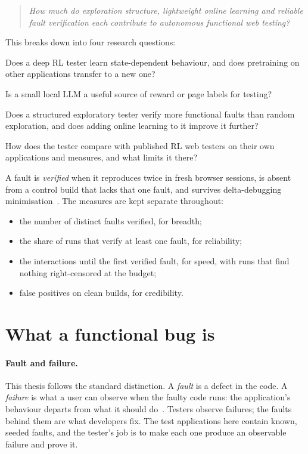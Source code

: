 \begin{quote}
\emph{How much do exploration structure, lightweight online learning and reliable fault
verification each contribute to autonomous functional web testing?}
\end{quote}

This breaks down into four research questions:
\begin{description}[noitemsep]
  \item[RQ1] Does a deep RL tester learn state-dependent behaviour, and does pretraining on
        other applications transfer to a new one?
  \item[RQ2] Is a small local LLM a useful source of reward or page labels for testing?
  \item[RQ3] Does a structured exploratory tester verify more functional faults than random
        exploration, and does adding online learning to it improve it further?
  \item[RQ4] How does the tester compare with published RL web testers on their own
        applications and measures, and what limits it there?
\end{description}

A fault is \emph{verified} when it reproduces twice in fresh browser sessions, is absent
from a control build that lacks that one fault, and survives delta-debugging
minimisation~\cite{zeller2002simplifying}. The measures are kept separate throughout:
\begin{itemize}[noitemsep]
  \item the number of distinct faults verified, for breadth;
  \item the share of runs that verify at least one fault, for reliability;
  \item the interactions until the first verified fault, for speed, with runs that find
        nothing right-censored at the budget;
  \item false positives on clean builds, for credibility.
\end{itemize}

\section{What a functional bug is}
\label{sec:functional-bug}

\paragraph{Fault and failure.} This thesis follows the standard distinction. A \emph{fault}
is a defect in the code. A \emph{failure} is what a user can observe when the faulty code
runs: the application's behaviour departs from what it should do~\cite{barr2015oracle}.
Testers observe failures; the faults behind them are what developers fix. The test
applications here contain known, seeded faults, and the tester's job is to make each one
produce an observable failure and prove it.

